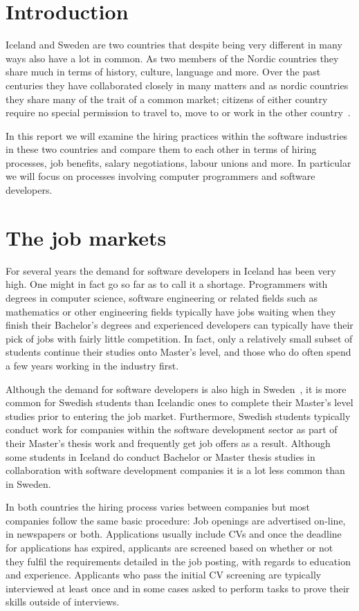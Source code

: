 \chapter{Introduction}
Iceland and Sweden are two countries that despite being very different in many ways also have a lot in common. As two members of the Nordic countries they share much in terms of history, culture, language and more. Over the past centuries they have collaborated closely in many matters and as nordic countries they share many of the trait of a common market; citizens of either country require no special permission to travel to, move to or work in the other country~\cite{norden}.

In this report we will examine the hiring practices within the software industries in these two countries and compare them to each other in terms of hiring processes, job benefits, salary negotiations, labour unions and more. In particular we will focus on processes involving computer programmers and software developers.

\chapter{The job markets}
For several years the demand for software developers in Iceland has been very high. One might in fact go so far as to call it a shortage. Programmers with degrees in computer science, software engineering or related fields such as mathematics or other engineering fields typically have jobs waiting when they finish their Bachelor's degrees and experienced developers can typically have their pick of jobs with fairly little competition.
In fact, only a relatively small subset of students continue their studies onto Master's level, and those who do often spend a few years working in the industry first.

Although the demand for software developers is also high in Sweden~\cite{Spotify}, it is more common for Swedish students than Icelandic ones to complete their Master's level studies prior to entering the job market. Furthermore, Swedish students typically conduct work for companies within the software development sector as part of their Master's thesis work and frequently get job offers as a result. Although some students in Iceland do conduct Bachelor or Master thesis studies in collaboration with software development companies it is a lot less common than in Sweden.

In both countries the hiring process varies between companies but most companies follow the same basic procedure: Job openings are advertised on-line, in newspapers or both. Applications usually include CVs and once the deadline for applications has expired, applicants are screened based on whether or not they fulfil the requirements detailed in the job posting, with regards to education and experience. Applicants who pass the initial CV screening are typically interviewed at least once and in some cases asked to perform tasks to prove their skills outside of interviews.

